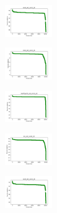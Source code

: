 \begin{figure}[H]
\begin{subfigure}
    \end{subfigure}
    \hfill
    \begin{subfigure}
        \centering
        \includegraphics[width=0.234\textwidth]{img/HS-LS-v2/ecoli_set_const_20_589741062_cost.png}
    \end{subfigure}
    \hfill
    \begin{subfigure}
        \centering
        \includegraphics[width=0.234\textwidth]{img/HS-LS-v2/rand_set_const_20_589741062_cost.png}
    \end{subfigure}
    \hfill
    \begin{subfigure}
        \centering
        \includegraphics[width=0.234\textwidth]{img/HS-LS-v2/newthyroid_set_const_20_589741062_cost.png}
    \end{subfigure}
    \hfill
    \begin{subfigure}
        \centering
        \includegraphics[width=0.234\textwidth]{img/HS-LS-v2/iris_set_const_20_277451237_cost.png}
    \end{subfigure}
    \hfill
    \begin{subfigure}
        \centering
        \includegraphics[width=0.234\textwidth]{img/HS-LS-v2/ecoli_set_const_20_277451237_cost.png}
    \end{subfigure}

\end{figure}
